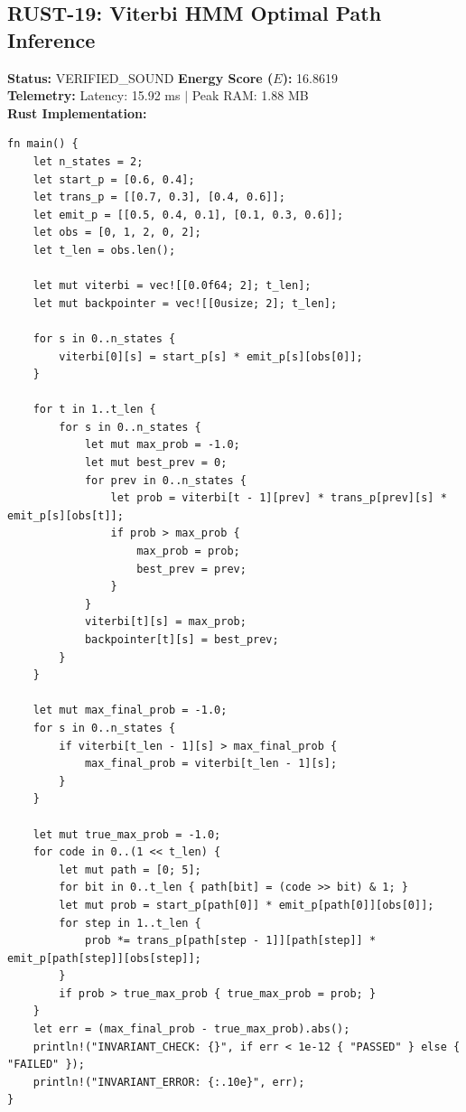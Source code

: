 \documentclass[11pt, a4paper]{article}
\begin{document}
\subsection{RUST-19: Viterbi HMM Optimal Path Inference}
\textbf{Status:} VERIFIED\_SOUND \hfill \textbf{Energy Score ($E$):} 16.8619\\
\textbf{Telemetry:} Latency: 15.92 ms $|$ Peak RAM: 1.88 MB\\
\textbf{Rust Implementation:}
\begin{verbatim}
fn main() {
    let n_states = 2;
    let start_p = [0.6, 0.4];
    let trans_p = [[0.7, 0.3], [0.4, 0.6]];
    let emit_p = [[0.5, 0.4, 0.1], [0.1, 0.3, 0.6]];
    let obs = [0, 1, 2, 0, 2];
    let t_len = obs.len();

    let mut viterbi = vec![[0.0f64; 2]; t_len];
    let mut backpointer = vec![[0usize; 2]; t_len];

    for s in 0..n_states {
        viterbi[0][s] = start_p[s] * emit_p[s][obs[0]];
    }

    for t in 1..t_len {
        for s in 0..n_states {
            let mut max_prob = -1.0;
            let mut best_prev = 0;
            for prev in 0..n_states {
                let prob = viterbi[t - 1][prev] * trans_p[prev][s] * emit_p[s][obs[t]];
                if prob > max_prob {
                    max_prob = prob;
                    best_prev = prev;
                }
            }
            viterbi[t][s] = max_prob;
            backpointer[t][s] = best_prev;
        }
    }

    let mut max_final_prob = -1.0;
    for s in 0..n_states {
        if viterbi[t_len - 1][s] > max_final_prob {
            max_final_prob = viterbi[t_len - 1][s];
        }
    }

    let mut true_max_prob = -1.0;
    for code in 0..(1 << t_len) {
        let mut path = [0; 5];
        for bit in 0..t_len { path[bit] = (code >> bit) & 1; }
        let mut prob = start_p[path[0]] * emit_p[path[0]][obs[0]];
        for step in 1..t_len {
            prob *= trans_p[path[step - 1]][path[step]] * emit_p[path[step]][obs[step]];
        }
        if prob > true_max_prob { true_max_prob = prob; }
    }
    let err = (max_final_prob - true_max_prob).abs();
    println!("INVARIANT_CHECK: {}", if err < 1e-12 { "PASSED" } else { "FAILED" });
    println!("INVARIANT_ERROR: {:.10e}", err);
}
\end{verbatim}
\end{document}
